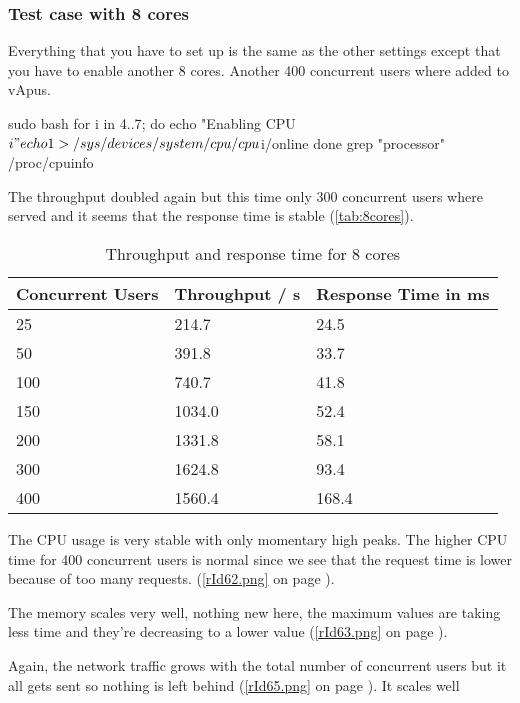 \clearpage{}

\subsubsection{Test case with 8 cores}
Everything that you have to set up is the same as the other settings except that you have to enable another 8 cores. Another 400 concurrent users where added to vApus.
\begin{codelisting}
sudo bash
for i in {4..7};  do
	echo "Enabling CPU$i"
	echo 1 > /sys/devices/system/cpu/cpu$i/online
done
grep "processor" /proc/cpuinfo
\end{codelisting}
The throughput doubled again but this time only 300 concurrent users where served and it seems that the response time is stable (\autoref{tab:8cores}).
\begin{table}[ht!]
\begin{center}
\caption{Throughput and response time for 8 cores}\label{tab:8cores}
\begin{tabular}{|p{2.2cm}|p{2.2cm}|p{2.2cm}|}\hline\rowcolor{myLightGreen}\arrayrulecolor{myLightGreen}
 {\bf\color{white} Concurrent Users} & {\bf\color{white} Throughput / s} & {\bf\color{white} Response Time in ms} \\ \hline 
 25 & 214.7 & 24.5 \\ \hline 
 50 & 391.8 & 33.7 \\ \hline 
 100 & 740.7 & 41.8 \\ \hline 
 150 & 1034.0 & 52.4 \\ \hline 
 200 & 1331.8 & 58.1 \\ \hline \rowcolor{rowhighlight}
 300 & 1624.8 & 93.4 \\ \hline 
 400 & 1560.4 & 168.4 \\ \hline 
\end{tabular}\end{center}
\end{table}

The CPU usage is very stable with only momentary high peaks. The higher CPU time for 400 concurrent users is normal since we see that the request time is lower because of too many requests. (\autoref{rId62.png} on page \pageref{rId62.png}).

The memory scales very well, nothing new here, the maximum values are taking less time and they're decreasing to a lower value (\autoref{rId63.png} on page \pageref{rId63.png}).

Again, the network traffic grows with the total number of concurrent users but it all gets sent so nothing is left behind (\autoref{rId65.png} on page \pageref{rId65.png}). It scales well
\clearpage{}
